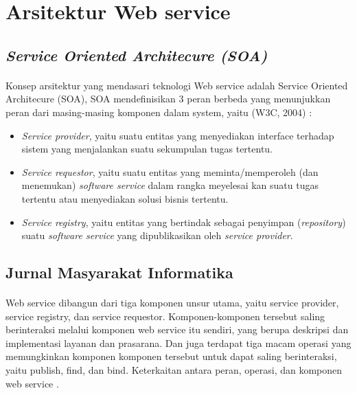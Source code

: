 \documentclass[12pt]{article}
\begin{document}
\section{Arsitektur Web service}

\subsection{\textit{Service Oriented Architecure (SOA)} }

\paragraph{}
Konsep arsitektur yang mendasari teknologi Web service adalah Service Oriented Architecure (SOA), SOA mendefinisikan 3 peran berbeda yang menunjukkan peran dari masing-masing komponen dalam system, yaitu (W3C, 2004) :
\begin{itemize}
\item \textit{Service provider}, yaitu suatu entitas yang menyediakan interface terhadap sistem yang menjalankan suatu sekumpulan tugas tertentu.
\item \textit{Service requestor}, yaitu suatu entitas yang meminta/memperoleh (dan menemukan) \textit{software service} dalam rangka meyelesai kan suatu tugas tertentu atau menyediakan solusi bisnis tertentu.
\item \textit{Service registry}, yaitu entitas yang bertindak sebagai penyimpan (\textit{repository}) suatu \textit{software service} yang dipublikasikan oleh \textit{service provider}\cite{hidayat2014penerapan}.
\end{itemize}

\subsection{Jurnal Masyarakat Informatika}

\paragraph{}
Web service dibangun dari tiga komponen unsur utama, yaitu service provider, service registry, dan service requestor. Komponen-komponen tersebut saling berinteraksi melalui komponen web service itu sendiri, yang berupa deskripsi dan implementasi layanan dan prasarana. Dan juga terdapat tiga macam operasi yang memungkinkan komponen komponen tersebut untuk dapat saling berinteraksi, yaitu publish, find, dan bind. Keterkaitan antara peran, operasi, dan komponen web service \cite{saputra2integrasi}.
\end{document}
